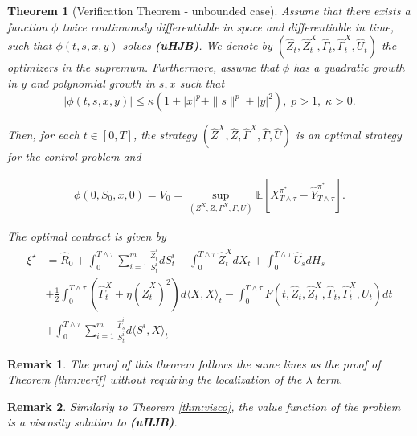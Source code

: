 \documentclass[11pt,a4paper]{article}
\theoremstyle{thmstyleone}%
\newtheorem{theorem}{Theorem}%
\theoremstyle{thmstyletwo}%
\newtheorem{remark}{Remark}%
\theoremstyle{thmstylethree}%
\newcommand{\T}{T \wedge \tau}
\begin{document}
\begin{theorem}[Verification Theorem - unbounded case]
Assume that there exists a function $\phi$ twice continuously differentiable in space and differentiable in time, such that $\phi(t,s,x,y)$ solves  \textbf{(uHJB)}. We denote by $(\hat Z_t, \hat Z_t^X, \hat \Gamma_t, \hat \Gamma_t^X, \hat U_t)$ the optimizers in the supremum. 
Furthermore, assume that $\phi$ has a quadratic growth in $y$ and polynomial growth in $s,x$ such that 
\[|\phi(t,s,x,y)|\leq \kappa(1+|x|^p+\|s\|^p+|y|^2),\; p>1,\; \kappa>0.\]

Then, for each $t \in [0,T]$, the strategy $(\hat{Z}^X, \hat{Z}, \hat{\Gamma}^X, \hat{\Gamma}, \hat{U})$ is an optimal strategy for the control problem and 

\begin{align*}
    \phi(0,S_0,x,0)=V_0=  \sup_{(Z^X, Z, \Gamma^X, \Gamma, U)} \mathbb{E}\left[X_{T \wedge \tau}^{\pi^*} -  \hat Y^{\pi^*}_{T \wedge \tau}\right].
\end{align*}

The optimal contract is given by 
\begin{align*}
    \xi^\star 
    &= \hat R_0+ \int_{0}^{\T} \sum_{i=1}^m \frac{\hat{Z}^i_t}{S^i_t} dS^i_t + \int_0^{\T} \hat{Z}_t^X dX_t + \int_{0}^{\T} \hat{U}_s dH_s \\
    &+ \frac{1}{2}\int_0^{\T} (\hat{\Gamma}_t^X + \eta (\hat{Z}_t^X)^2 ) d\langle X, X\rangle_t - \int_0^{\T} F(t, \hat{Z}_t, \hat{Z}_t^X, \hat{\Gamma}_t, \hat{\Gamma}_t^X,U_t) dt\\
    &+\int_0^{\T} \sum_{i=1}^m \frac{\hat{\Gamma}^i_s}{S^i_t} d\langle S^i, X\rangle_t 
\end{align*}
\end{theorem}

\begin{remark}
    The proof of this theorem follows the same lines as the proof of Theorem \ref{thm:verif} without requiring the localization of the $\lambda$ term.
\end{remark}
\begin{remark}
    Similarly to Theorem \ref{thm:visco}, the value function of the problem is a viscosity solution to \textbf{(uHJB)}.
\end{remark}
\end{document}
